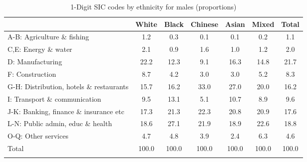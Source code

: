 \begin{table}[htbp]\centering
\def\sym#1{\ifmmode^{#1}\else\(^{#1}\)\fi}
\caption{1-Digit SIC codes by ethnicity for males (proportions)}
\begin{tabular}{l*{6}{c}}
\hline\hline
          &    White&    Black&  Chinese&    Asian&    Mixed&    Total\\
\hline
A-B: Agriculture \& fishing&      1.2&      0.3&      0.1&      0.1&      0.2&      1.1\\
C,E: Energy \& water&      2.1&      0.9&      1.6&      1.0&      1.2&      2.0\\
D: Manufacturing&     22.2&     12.3&      9.1&     16.3&     14.8&     21.7\\
F: Construction&      8.7&      4.2&      3.0&      3.0&      5.2&      8.3\\
G-H: Distribution, hotels \& restaurants&     15.7&     16.2&     33.0&     27.0&     20.0&     16.2\\
I: Transport \& communication&      9.5&     13.1&      5.1&     10.7&      8.9&      9.6\\
J-K: Banking, finance \& insurance etc&     17.3&     21.3&     22.3&     20.8&     20.9&     17.6\\
L-N: Public admin, educ \& health&     18.6&     27.1&     21.9&     18.9&     22.6&     18.8\\
O-Q: Other services&      4.7&      4.8&      3.9&      2.4&      6.3&      4.6\\
Total     &    100.0&    100.0&    100.0&    100.0&    100.0&    100.0\\
\hline\hline
\label{tab:1D_industries_male}
\end{tabular}
\end{table}
